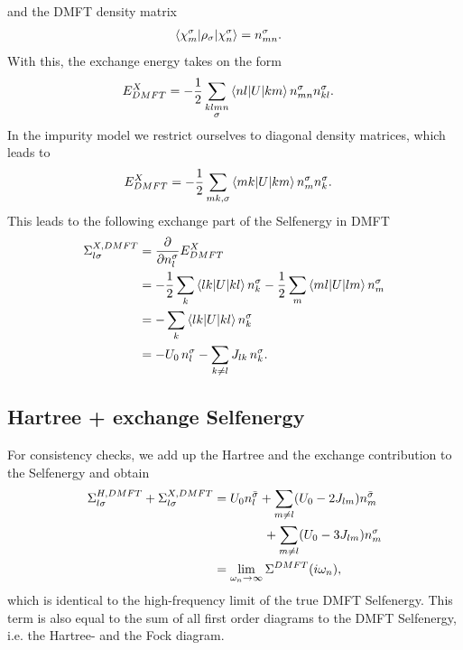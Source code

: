 \documentclass[12pt,a4paper]{scrartcl}
\numberwithin{equation}{section}
\begin{document}
and the DMFT density matrix
\begin{align}
\braket{\chi^{\sigma}_m | \rho_{\sigma} | \chi^{\sigma}_n } 
&= n^{\sigma}_{mn}.
\end{align}
With this, the exchange energy takes on the form
\begin{align}
E^X_{DMFT}
&= -\frac{1}{2} \sum_{\substack{klmn\\\sigma}}\braket{nl|U|km} n^{\sigma}_{mn} n^{\sigma}_{kl}.
\end{align}
In the impurity model we restrict ourselves to diagonal density matrices, which leads to
\begin{align}
E^X_{DMFT}
&= -\frac{1}{2} \sum_{mk,\sigma}\braket{mk|U|km} n^{\sigma}_{m} n^{\sigma}_{k} .
\end{align}
This leads to the following exchange part of the Selfenergy in DMFT
\begin{align}
\Sigma^{X,DMFT}_{l\sigma}
&= \frac{\partial }{\partial n^{\sigma}_l} E^X_{DMFT} \\
%
&= -\frac{1}{2} \sum_{k}\braket{lk|U|kl} n^{\sigma}_{k} 
   -\frac{1}{2} \sum_{m}\braket{ml|U|lm} n^{\sigma}_{m}  \\
%
&= - \sum_{k}\braket{lk|U|kl} n^{\sigma}_{k} \\
%
&= - U_0\, n^{\sigma}_l -  \sum_{k\neq l} J_{lk} \, n^{\sigma}_{k}.
\end{align}

\subsection{Hartree + exchange Selfenergy}
For consistency checks, we add up the Hartree and the exchange contribution
to the Selfenergy and obtain
\begin{align}
\Sigma^{H,DMFT}_{l\sigma} + \Sigma^{X,DMFT}_{l\sigma}
%
&= U_0 n^{\bar{\sigma}}_l 
%
               + \sum_{m\neq l} (U_0-2J_{lm}) n^{\bar{\sigma}}_m  \nonumber \\
& \hspace{1.4cm} + \sum_{m\neq l} (U_0-3J_{lm}) n^{     \sigma }_m  \\
&= \lim_{\omega_n\rightarrow \infty} \Sigma^{DMFT}(i\omega_n),
\end{align}
which is identical to the high-frequency limit of the true DMFT Selfenergy.
This term is also equal to the sum of all first order diagrams to the
DMFT Selfenergy, i.e. the Hartree- and the Fock diagram.

\end{document}
